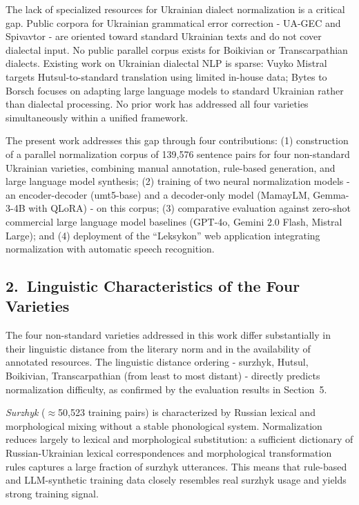 \documentclass[14pt]{extarticle}
\begin{document}
The lack of specialized resources for Ukrainian dialect normalization is a critical gap. Public
corpora for Ukrainian grammatical error correction - UA-GEC and Spivavtor - are oriented toward
standard Ukrainian texts and do not cover dialectal input. No public parallel corpus exists for
Boikivian or Transcarpathian dialects. Existing work on Ukrainian dialectal NLP is sparse:
Vuyko Mistral targets Hutsul-to-standard translation using limited in-house data; Bytes to Borsch
focuses on adapting large language models to standard Ukrainian rather than dialectal processing.
No prior work has addressed all four varieties simultaneously within a unified framework.

The present work addresses this gap through four contributions: (1) construction of a parallel
normalization corpus of 139,576 sentence pairs for four non-standard Ukrainian varieties, combining
manual annotation, rule-based generation, and large language model synthesis; (2) training of two
neural normalization models - an encoder-decoder (umt5-base) and a decoder-only model (MamayLM,
Gemma-3-4B with QLoRA) - on this corpus; (3) comparative evaluation against zero-shot commercial
large language model baselines (GPT-4o, Gemini 2.0 Flash, Mistral Large); and (4) deployment of
the ``Leksykon'' web application integrating normalization with automatic speech recognition.

\subsection*{2.~Linguistic Characteristics of the Four Varieties}

The four non-standard varieties addressed in this work differ substantially in their linguistic
distance from the literary norm and in the availability of annotated resources. The linguistic
distance ordering - surzhyk, Hutsul, Boikivian, Transcarpathian (from least to most distant) -
directly predicts normalization difficulty, as confirmed by the evaluation results in Section~5.

\textit{Surzhyk} (${\approx}$50,523 training pairs) is characterized by Russian lexical and
morphological mixing without a stable phonological system. Normalization reduces largely to lexical
and morphological substitution: a sufficient dictionary of Russian-Ukrainian lexical correspondences
and morphological transformation rules captures a large fraction of surzhyk utterances. This means
that rule-based and LLM-synthetic training data closely resembles real surzhyk usage and yields
strong training signal.
\end{document}
